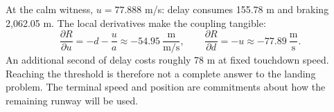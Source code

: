 
At the calm witness, $u=77.888$ m/s: delay consumes 155.78 m and braking 2,062.05 m. The local derivatives make the coupling tangible:
\begin{equation}
\frac{\partial R}{\partial u}=-d-\frac{u}{a}\approx-54.95\ \frac{\mathrm m}{\mathrm{m/s}},
\qquad \frac{\partial R}{\partial d}=-u\approx-77.89\ \frac{\mathrm m}{\mathrm s}.
\end{equation}
An additional second of delay costs roughly 78 m at fixed touchdown speed. Reaching the threshold is therefore not a complete answer to the landing problem. The terminal speed and position are commitments about how the remaining runway will be used.
\clearpage
